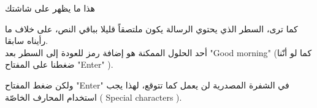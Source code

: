 هذا ما يظهر على شاشتك

كما ترى، السطر الذي يحتوي الرسالة يكون ملتصقاً قليلا بباقي النص، على خلاف ما رأيناه سابقا.\\
أحد الحلول الممكنة هو إضافة رمز للعودة إلى السطر بعد
 "\textenglish{Good morning}"
 (كما لو أنّنا ضغطنا على المفتاح
"\textenglish{Enter}"
).

ولكن ضغط المفتاح
"\textenglish{Enter}"
 في الشفرة المصدرية لن يعمل كما تتوقع، لهذا يجب استخدام المحارف الخاصّة (
\textenglish{Special characters}
).
